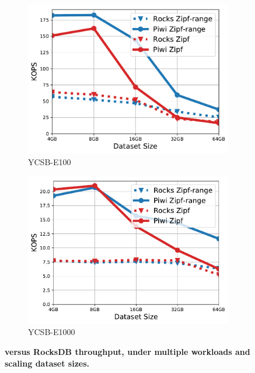 \begin{figure}[tb]
\begin{subfigure}{0.3\linewidth}
\label{fig:throughput:e10}
\end{subfigure}
\begin{subfigure}{0.3\linewidth}
\includegraphics[width=\textwidth]{figs/Workload_E_line.pdf}
\caption{YCSB-E100}
\label{fig:throughput:e100}
\end{subfigure}
\begin{subfigure}{0.3\linewidth}
\includegraphics[width=\textwidth]{figs/Workload_E+_line.pdf}
\caption{YCSB-E1000}
\label{fig:throughput:e1000}
\end{subfigure}
\caption{\bf{\sys\/ versus RocksDB throughput, under multiple workloads and scaling dataset sizes.}}
\label{fig:throughput}
\end{figure}

